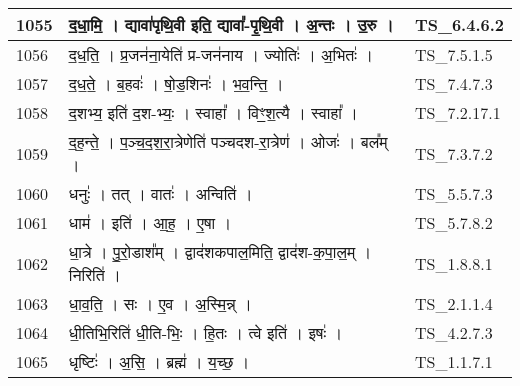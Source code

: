 \documentclass[17pt]{extarticle}
\begin{document}
\begin{longtable}{||p{0.4in}||p{4.9in}||p{0.9in}||}
    1055 & द॒धा॒मि॒   ।   द्यावा॑पृथि॒वी इति॒ द्यावा᳚{-}पृ॒थि॒वी   ।   अ॒न्तः   ।   उ॒रु   ।    & TS\_6.4.6.2       \\
    
    \hline
        
    1056 & द॒ध॒ति॒   ।   प्र॒जन॑ना॒येति॑ प्र{-}जन॑नाय   ।   ज्योतिः॑   ।   अ॒भितः॑   ।    & TS\_7.5.1.5       \\
    
    \hline
        
    1057 & द॒ध॒ते॒   ।   ब॒हवः॑   ।   षो॒ड॒शिनः॑   ।   भ॒व॒न्ति॒   ।    & TS\_7.4.7.3       \\
    
    \hline
        
    1058 & द॒शभ्य॒ इति॑ द॒श{-}भ्यः॒   ।   स्वाहा᳚   ।   विꣳ॒॒श॒त्यै   ।   स्वाहा᳚   ।    & TS\_7.2.17.1       \\
    
    \hline
        
    1059 & द॒ह॒न्ते॒   ।   प॒ञ्च॒द॒श॒रा॒त्रेणेति॑ पञ्चदश{-}रा॒त्रेण॑   ।   ओजः॑   ।   बल᳚म्   ।    & TS\_7.3.7.2       \\
    
    \hline
        
    1060 & धनुः॑   ।   तत्   ।   वातः॑   ।   अन्विति॑   ।    & TS\_5.5.7.3       \\
    
    \hline
        
    1061 & धाम॑   ।   इति॑   ।   आ॒ह॒   ।   ए॒षा   ।    & TS\_5.7.8.2       \\
    
    \hline
        
    1062 & धा॒त्रे   ।   पु॒रो॒डाश᳚म्   ।   द्वाद॑शकपाल॒मिति॒ द्वाद॑श{-}क॒पा॒ल॒म्   ।   निरिति॑   ।    & TS\_1.8.8.1       \\
    
    \hline
        
    1063 & धा॒व॒ति॒   ।   सः   ।   ए॒व   ।   अ॒स्मि॒न्न्   ।    & TS\_2.1.1.4       \\
    
    \hline
        
    1064 & धी॒तिभि॒रिति॑ धी॒ति{-}भिः॒   ।   हि॒तः   ।   त्वे इति॑   ।   इषः॑   ।    & TS\_4.2.7.3       \\
    
    \hline
        
    1065 & धृष्टिः॑   ।   अ॒सि॒   ।   ब्रह्म॑   ।   य॒च्छ॒   ।    & TS\_1.1.7.1       \\
    

\end{longtable}
\end{document}
